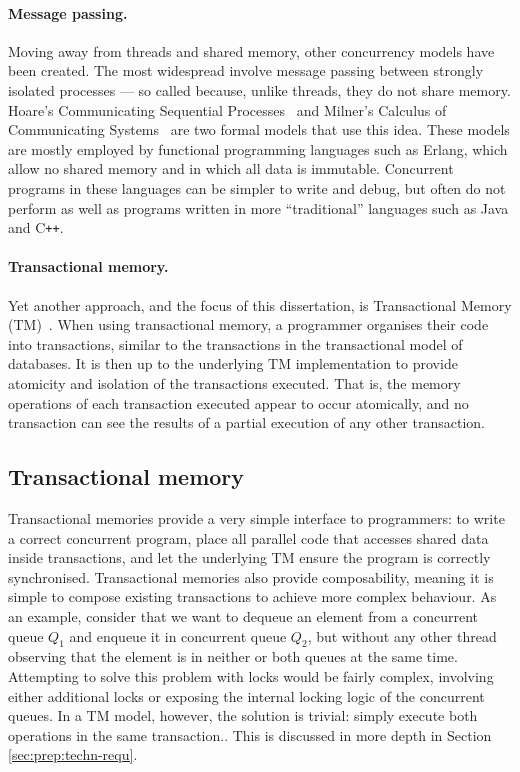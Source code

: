 \documentclass[12pt,a4paper,oneside,openright]{report}
\begin{document}
\paragraph{Message passing.} Moving away from threads and shared
memory, other concurrency models have been created. The most
widespread involve message passing between strongly isolated processes
--- so called because, unlike threads, they do not share
memory. Hoare's Communicating Sequential Processes~\cite{CSP} and
Milner's Calculus of Communicating Systems~\cite{CCS} are two formal
models that use this idea. These models are mostly employed by
functional programming languages such as Erlang, which allow no shared
memory and in which all data is immutable. Concurrent programs in
these languages can be simpler to write and debug, but often do not
perform as well as programs written in more ``traditional'' languages
such as Java and C\texttt{++}.

\paragraph{Transactional memory.} Yet another approach, and the focus
of this dissertation, is Transactional Memory (TM)~\cite{TMBook}. When
using transactional memory, a programmer organises their code into
transactions, similar to the transactions in the transactional model
of databases. It is then up to the underlying TM implementation to
provide atomicity and isolation of the transactions executed. That is,
the memory operations of each transaction executed appear to occur
atomically, and no transaction can see the results of a partial
execution of any other transaction.

\subsection{Transactional memory}
\label{sec:transactional-memory}

Transactional memories provide a very simple interface to programmers:
to write a correct concurrent program, place all parallel code that
accesses shared data inside transactions, and let the underlying TM
ensure the program is correctly synchronised. Transactional memories
also provide composability, meaning it is simple to compose existing
transactions to achieve more complex behaviour. As an example,
consider that we want to dequeue an element from a concurrent queue
$Q_1$ and enqueue it in concurrent queue $Q_2$, but without any other
thread observing that the element is in neither or both queues at the
same time. Attempting to solve this problem with locks would be fairly
complex, involving either additional locks or exposing the internal
locking logic of the concurrent queues. In a TM model, however, the
solution is trivial: simply execute both operations in the same
transaction.. This is discussed in more depth in Section
\ref{sec:prep:techn-requ}.
\end{document}
